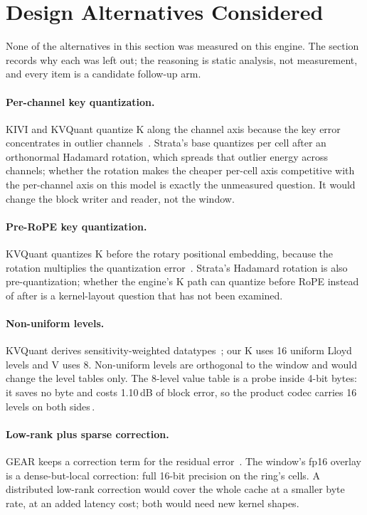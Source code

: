 \documentclass[10pt,twocolumn]{article}
\begin{document}
\section{Design Alternatives Considered}\label{sec:alternatives}

None of the alternatives in this section was measured on this engine. The section records why each was left out; the reasoning is static analysis, not measurement, and every item is a candidate follow-up arm.

\paragraph{Per-channel key quantization.} KIVI and KVQuant quantize K along the channel axis because the key error concentrates in outlier channels~\cite{kivi,kvquant}. Strata's base quantizes per cell after an orthonormal Hadamard rotation, which spreads that outlier energy across channels; whether the rotation makes the cheaper per-cell axis competitive with the per-channel axis on this model is exactly the unmeasured question. It would change the block writer and reader, not the window.

\paragraph{Pre-RoPE key quantization.} KVQuant quantizes K before the rotary positional embedding, because the rotation multiplies the quantization error~\cite{kvquant}. Strata's Hadamard rotation is also pre-quantization; whether the engine's K path can quantize before RoPE instead of after is a kernel-layout question that has not been examined.

\paragraph{Non-uniform levels.} KVQuant derives sensitivity-weighted datatypes~\cite{kvquant}; our K uses 16 uniform Lloyd levels and V uses 8. Non-uniform levels are orthogonal to the window and would change the level tables only. The 8-level value table is a probe inside 4-bit bytes: it saves no byte and costs 1.10\,dB of block error, so the product codec carries 16 levels on both sides\,\cite{mean-centered}.

\paragraph{Low-rank plus sparse correction.} GEAR keeps a correction term for the residual error~\cite{gear}. The window's fp16 overlay is a dense-but-local correction: full 16-bit precision on the ring's cells. A distributed low-rank correction would cover the whole cache at a smaller byte rate, at an added latency cost; both would need new kernel shapes.
\end{document}
